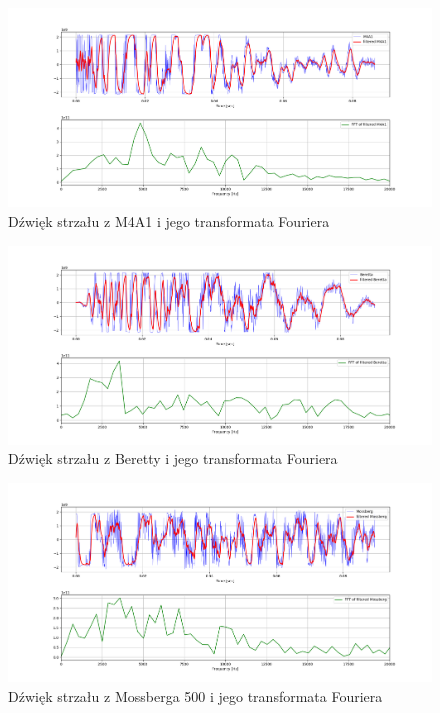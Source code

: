 \begin{figure}[H]
	\centering
	\includegraphics[scale=0.35]{wykresy/M4A1_fft.png}
	\caption{\label{m4a1_fft} Dźwięk strzału z M4A1 i jego transformata Fouriera}
\end{figure}

\begin{figure}[H]
	\centering
	\includegraphics[scale=0.35]{wykresy/Beretta_fft.png}
	\caption{\label{beretta_fft} Dźwięk strzału z Beretty i jego transformata Fouriera}
\end{figure}

\begin{figure}[H]
	\centering
	\includegraphics[scale=0.35]{wykresy/Mossberg_fft.png}
	\caption{\label{mossberg_fft} Dźwięk strzału z Mossberga 500 i jego transformata Fouriera}
\end{figure}

